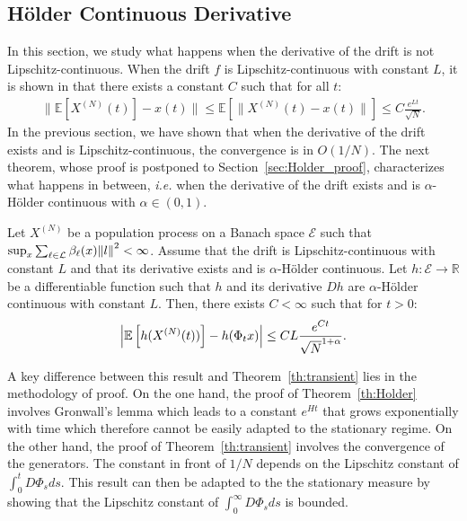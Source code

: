 \documentclass[acmlarge]{acmart}
\newcommand\XN{X^{(N)}}
\newcommand\E{\mathcal{E}}
\newcommand\R{\mathbb{R}}
\newcommand\calL{\mathcal{L}}
\newcommand\esp[1]{{\mathchoice{\besp{#1}}{\sesp{#1}}{\sesp{#1}}{\sesp{#1}}}}
\newcommand\besp[1]{\mathbb{E}\left[#1\right]}
\newcommand\sesp[1]{\mathbb{E}[#1]}
\newcommand\norm[1]{{\mathchoice{\bnorm{#1}}{\snorm{#1}}{\snorm{#1}}{\snorm{#1}}}}
\newcommand\bnorm[1]{\left\|#1\right\|}
\newcommand\snorm[1]{\|#1\|}
\newcommand\abs[1]{\left|#1\right|}
\begin{document}
\subsection{Hölder Continuous Derivative}
\label{sec:holder}

In this section, we study what happens when the derivative of the
drift is not Lipschitz-continuous.  When the drift $f$ is
Lipschitz-continuous with constant $L$, it is shown in \cite{kurtz70}
that there exists a constant $C$ such that for all $t$:
\begin{align*}
  \snorm{\sesp{\XN(t)}-x(t)}\le \sesp{\snorm{\XN(t)-x(t)}}\le C
  \frac{e^{Lt}}{\sqrt{N}}. 
\end{align*}
In the previous section, we have shown that when the derivative of the
drift exists and is Lipschitz-continuous, the convergence is in
$O(1/N)$.  The next theorem, whose proof is postponed to
Section~\ref{sec:Holder_proof}, characterizes what happens in between,
\emph{i.e.}  when the derivative of the drift exists and is
$\alpha$-Hölder continuous with $\alpha\in(0,1)$.
\begin{theorem}
  \label{th:Holder}
  Let $\XN$ be a population process on a Banach space $\E$ such that
  $\sup_x\sum_{\ell\in\calL}\beta_\ell(x)\norm{l}^2<\infty$. Assume
  that the drift is Lipschitz-continuous with constant $L$ and that
  its derivative exists and is $\alpha$-Hölder continuous.  Let
  $h:\E\to\R$ be a differentiable function such that $h$ and its
  derivative $Dh$ are $\alpha$-Hölder continuous with constant
  $L$. Then, there exists $C<\infty$ such that for $t>0$:
  \begin{align*}
    \abs{\esp{h(\XN(t))}-h(\Phi_tx)} \le CL\frac{e^{Ct}}{\sqrt{N}^{1+\alpha}}.
  \end{align*}
\end{theorem}

A key difference between this result and Theorem~\ref{th:transient}
lies in the methodology of proof. On the one hand, the proof of
Theorem~\ref{th:Holder} involves Gronwall's lemma which leads to a
constant $e^{Ht}$ that grows exponentially with time which therefore
cannot be easily adapted to the stationary regime. On the other hand,
the proof of Theorem~\ref{th:transient} involves the convergence of
the generators. The constant in front of $1/N$ depends on the
Lipschitz constant of $\int_0^tD\Phi_sds$.  This result can then be
adapted to the the stationary measure by showing that the Lipschitz
constant of $\int_0^\infty D\Phi_sds$ is bounded.
\end{document}
